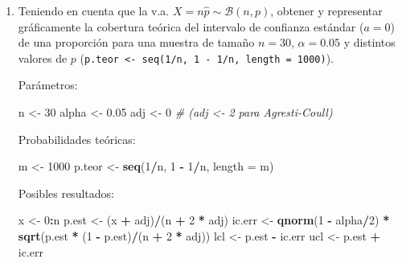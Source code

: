 \documentclass[]{book}
\newenvironment{Shaded}{\begin{snugshade}}{\end{snugshade}}
\newcommand{\KeywordTok}[1]{\textcolor[rgb]{0.13,0.29,0.53}{\textbf{#1}}}
\newcommand{\DataTypeTok}[1]{\textcolor[rgb]{0.13,0.29,0.53}{#1}}
\newcommand{\DecValTok}[1]{\textcolor[rgb]{0.00,0.00,0.81}{#1}}
\newcommand{\FloatTok}[1]{\textcolor[rgb]{0.00,0.00,0.81}{#1}}
\newcommand{\StringTok}[1]{\textcolor[rgb]{0.31,0.60,0.02}{#1}}
\newcommand{\CommentTok}[1]{\textcolor[rgb]{0.56,0.35,0.01}{\textit{#1}}}
\newcommand{\OperatorTok}[1]{\textcolor[rgb]{0.81,0.36,0.00}{\textbf{#1}}}
\newcommand{\NormalTok}[1]{#1}
\theoremstyle{definition}
\theoremstyle{definition}
\theoremstyle{definition}
\theoremstyle{remark}
\begin{document}
\begin{enumerate}
\def\labelenumi{\alph{enumi})}
\item
  Teniendo en cuenta que la v.a. \(X=n\hat{p}\sim\mathcal{B}(n,p)\),
  obtener y representar gráficamente la cobertura teórica del intervalo
  de confianza estándar (\(a=0\)) de una proporción para una muestra de
  tamaño \(n=30\), \(\alpha=0.05\) y distintos valores de \(p\)
  (\texttt{p.teor\ \textless{}-\ seq(1/n,\ 1\ -\ 1/n,\ length\ =\ 1000)}).

  Parámetros:

\begin{Shaded}
\begin{Highlighting}[]
\NormalTok{n <-}\StringTok{ }\DecValTok{30}
\NormalTok{alpha <-}\StringTok{ }\FloatTok{0.05}
\NormalTok{adj <-}\StringTok{ }\DecValTok{0}  \CommentTok{# (adj <- 2 para Agresti-Coull)}
\end{Highlighting}
\end{Shaded}

  Probabilidades teóricas:

\begin{Shaded}
\begin{Highlighting}[]
\NormalTok{m <-}\StringTok{ }\DecValTok{1000}
\NormalTok{p.teor <-}\StringTok{ }\KeywordTok{seq}\NormalTok{(}\DecValTok{1}\OperatorTok{/}\NormalTok{n, }\DecValTok{1} \OperatorTok{-}\StringTok{ }\DecValTok{1}\OperatorTok{/}\NormalTok{n, }\DataTypeTok{length =}\NormalTok{ m) }
\end{Highlighting}
\end{Shaded}

  Posibles resultados:

\begin{Shaded}
\begin{Highlighting}[]
\NormalTok{x <-}\StringTok{ }\DecValTok{0}\OperatorTok{:}\NormalTok{n}
\NormalTok{p.est <-}\StringTok{ }\NormalTok{(x }\OperatorTok{+}\StringTok{ }\NormalTok{adj)}\OperatorTok{/}\NormalTok{(n }\OperatorTok{+}\StringTok{ }\DecValTok{2} \OperatorTok{*}\StringTok{ }\NormalTok{adj) }
\NormalTok{ic.err <-}\StringTok{ }\KeywordTok{qnorm}\NormalTok{(}\DecValTok{1} \OperatorTok{-}\StringTok{ }\NormalTok{alpha}\OperatorTok{/}\DecValTok{2}\NormalTok{) }\OperatorTok{*}\StringTok{ }\KeywordTok{sqrt}\NormalTok{(p.est }\OperatorTok{*}\StringTok{ }\NormalTok{(}\DecValTok{1} \OperatorTok{-}\StringTok{ }\NormalTok{p.est)}\OperatorTok{/}\NormalTok{(n }\OperatorTok{+}\StringTok{ }\DecValTok{2} \OperatorTok{*}\StringTok{ }\NormalTok{adj))  }
\NormalTok{lcl <-}\StringTok{ }\NormalTok{p.est }\OperatorTok{-}\StringTok{ }\NormalTok{ic.err }
\NormalTok{ucl <-}\StringTok{ }\NormalTok{p.est }\OperatorTok{+}\StringTok{ }\NormalTok{ic.err }
\end{Highlighting}
\end{Shaded}


\end{enumerate}
\end{document}

